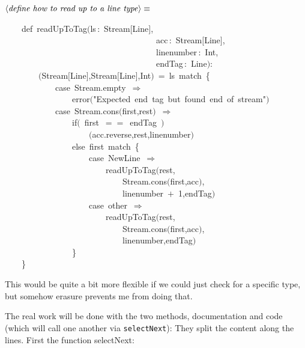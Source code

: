 \documentclass[a4paper,12pt]{article}
\begin{document}
$\left<\mbox{\emph{define how to read up to a line type}}\right>\equiv$
\begin{program}~~~~{\vem def}~readUpToTag$($ls\,{\rm :}~Stream$[$Line$]$,
\\~~~~~~~~~~~~~~~~~~~~~~~~~~~~~~~~~~~~acc\,{\rm :}~Stream$[$Line$]$,
\\~~~~~~~~~~~~~~~~~~~~~~~~~~~~~~~~~~~~linenumber\,{\rm :}~Int,
\\~~~~~~~~~~~~~~~~~~~~~~~~~~~~~~~~~~~~endTag\,{\rm :}~Line$)${\rm :}
\\~~~~~~~~$($Stream$[$Line$]$,Stream$[$Line$]$,Int$)$~=~ls~{\vem match}~{\small\{}
\\~~~~~~~~~~~~{\vem case}~Stream.empty~$\Rightarrow$
\\~~~~~~~~~~~~~~~~error$($"Expected~end~tag~but~found~end~of~stream"$)$
\\~~~~~~~~~~~~{\vem case}~Stream.cons$($first,rest$)$~$\Rightarrow$
\\~~~~~~~~~~~~~~~~{\vem if}$($~first~$==$~endTag~$)$
\\~~~~~~~~~~~~~~~~~~~~$($acc.reverse,rest,linenumber$)$
\\~~~~~~~~~~~~~~~~{\vem else}~first~{\vem match}~{\small\{}
\\~~~~~~~~~~~~~~~~~~~~{\vem case}~NewLine~$\Rightarrow$
\\~~~~~~~~~~~~~~~~~~~~~~~~readUpToTag$($rest,
\\~~~~~~~~~~~~~~~~~~~~~~~~~~~~Stream.cons$($first,acc$)$,
\\~~~~~~~~~~~~~~~~~~~~~~~~~~~~linenumber~$+$~1,endTag$)$
\\~~~~~~~~~~~~~~~~~~~~{\vem case}~other~$\Rightarrow$
\\~~~~~~~~~~~~~~~~~~~~~~~~readUpToTag$($rest,
\\~~~~~~~~~~~~~~~~~~~~~~~~~~~~Stream.cons$($first,acc$)$,
\\~~~~~~~~~~~~~~~~~~~~~~~~~~~~linenumber,endTag$)$
\\~~~~~~~~~~~~~~~~{\small\}}
\\~~~~{\small\}}
\\[0.5em]\end{program}
This would be quite a bit more flexible if we could just check for
a specific type, but somehow erasure prevents me from doing that.

The real work will be done with the two methods, documentation and
code (which will call one another via \texttt{selectNext}): They split the
content along the lines. First the function selectNext:
\end{document}
